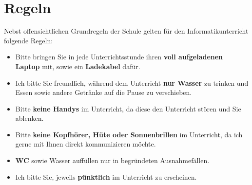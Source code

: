 \section*{Regeln}

Nebst offensichtlichen Grundregeln der Schule gelten für den Informatikunterricht folgende Regeln:

\begin{itemize}
	\item[\faLaptop] Bitte bringen Sie in jede Unterrichtsstunde ihren \textbf{voll aufgeladenen Laptop} mit, sowie ein \textbf{Ladekabel} dafür.
	\item[\faTint] Ich bitte Sie freundlich, während dem Unterricht \textbf{nur Wasser} zu trinken und Essen sowie andere Getränke auf die Pause zu verschieben.
	\item[\faMobile] Bitte \textbf{keine Handys} im Unterricht, da diese den Unterricht stören und Sie ablenken.
	\item[\faHeadphones] Bitte \textbf{keine Kopfhörer, Hüte oder Sonnenbrillen} im Unterricht, da ich gerne mit Ihnen direkt kommunizieren möchte.
	\item[\faRestroom] \textbf{WC} sowie Wasser auffüllen nur in begründeten Ausnahmefällen.
	\item[\faClock] Ich bitte Sie, jeweils \textbf{pünktlich} im Unterricht zu erscheinen.
\end{itemize}

\begin{notizTemplate}[title={Weitere, gemeinsam vereinbarte Grundwerte und Regeln}, height=5cm]
	
\end{notizTemplate}

\begin{notizTemplate}[title={\emoji{pen} Unterschriften},height=7cm,colframe=RoyalBlue,colbacktitle=RoyalBlue]

\end{notizTemplate}




